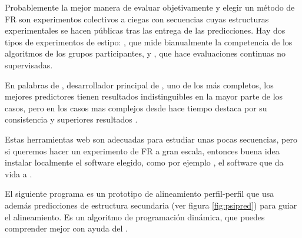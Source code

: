 Probablemente la mejor manera de evaluar objetivamente y elegir un m\'{e}todo de FR 
son experimentos colectivos a ciegas con secuencias cuyas estructuras experimentales se hacen p\'{u}blicas
tras las entrega de las predicciones. Hay dos tipos de experimentos de estipo: 
, 
que mide bianualmente la competencia de los algoritmos de los grupos participantes, y 
, que hace evaluaciones continuas no supervisadas.

En palabras de \citet{Kelley2015}, desarrollador principal de 
, uno de los m\'{a}s completos,
los mejores predictores tienen resultados indistinguibles en la mayor parte de los casos,
pero en los casos mas complejos desde hace tiempo destaca por su consistencia y 
superiores resultados .


Estas herramientas web son adecuadas para estudiar unas pocas secuencias, pero si queremos hacer un experimento de FR 
a gran escala, entonces buena idea instalar localmente el software elegido, como por ejemplo
, el software que da vida a 
.

El siguiente programa es un prototipo de alineamiento perfil-perfil que usa adem\'{a}s predicciones de estructura secundaria (ver figura \ref{fig:psipred}) 
para guiar el alineamiento. Es un algoritmo de programaci\'{o}n din\'{a}mica, que puedes comprender mejor con ayuda 
del  \citep{Ibarra2010}.

